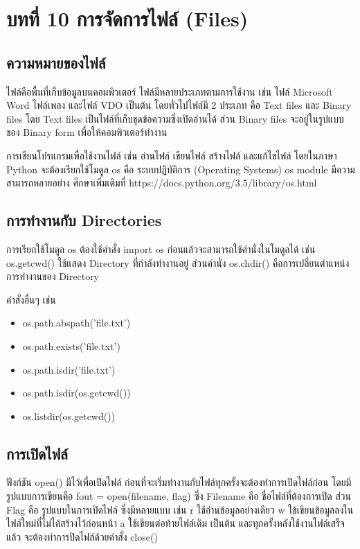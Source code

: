 \chapter{บทที่ 10	การจัดการไฟล์ (Files)}
\section{ความหมายของไฟล์}

ไฟล์คือพื้นที่เก็บข้อมูลบนคอมพิวเตอร์ ไฟล์มีหลายประเภทตามการใช้งาน เช่น ไฟล์ Microsoft Word ไฟล์เพลง และไฟล์ VDO เป็นต้น โดยทั่วไปไฟล์มี 2 ประเภท คือ Text files และ Binary files โดย Text files เป็นไฟล์ที่เก็บชุดข้อความซึ่งเปิดอ่านได้ ส่วน Binary files จะอยู่ในรูปแบบของ Binary form เพื่อให้คอมพิวเตอร์ทำงาน

การเขียนโปรแกรมเพื่อใช้งานไฟล์ เช่น อ่านไฟล์ เขียนไฟล์ สร้างไฟล์ และแก้ไขไฟล์ โดยในภาษา Python จะต้องเรียกใช้โมดูล os คือ ระบบปฏิบัติการ (Operating Systems) os module มีความสามารถหลายอย่าง ศึกษาเพิ่มเติมที่ https://docs.python.org/3.5/library/os.html

\section{การทำงานกับ Directories}

การเรียกใช้โมดูล os ต้องใช้คำสั่ง import os ก่อนแล้วจะสามารถใช้คำนั่งในโมดูลได้ เช่น os.getcwd() ใช้แสดง Directory ที่กำลังทำงานอยู่ ส่วนคำนั่ง os.chdir() คือการเปลี่ยนตำแหน่งการทำงานของ Directory

คำสั่งอื่นๆ เช่น 

\begin{itemize}
\item 	os.path.abspath('file.txt') 
\item 	os.path.exists('file.txt') 
\item 	os.path.isdir('file.txt') 
\item 	os.path.isdir(os.getcwd()) 
\item 	os.listdir(os.getcwd())
\end{itemize}

\section{การเปิดไฟล์}

ฟังก์ชัน open() มีไว้เพื่อเปิดไฟล์ ก่อนที่จะเริ่มทำงานกับไฟล์ทุกครั้งจะต้องทำการเปิดไฟล์ก่อน โดยมีรูปแบบการเขียนคือ fout = open(filename, flag) ซึ่ง Filename คือ ชื่อไฟล์ที่ต้องการเปิด ส่วน Flag คือ รูปแบบในการเปิดไฟล์ ซึ่งมีหลายแบบ เช่น r ใช้อ่านข้อมูลอย่างเดียว w ใข้เขียนข้อมูลลงในไฟล์ใหม่ที่ไม่ได้สร้างไว้ก่อนหน้า a ใช้เขียนต่อท้ายไฟล์เดิม เป็นต้น และทุกครั้งหลังใช้งานไฟล์เสร็จแล้ว จะต้องทำการปิดไฟล์ด้วยคำสั่ง close()

